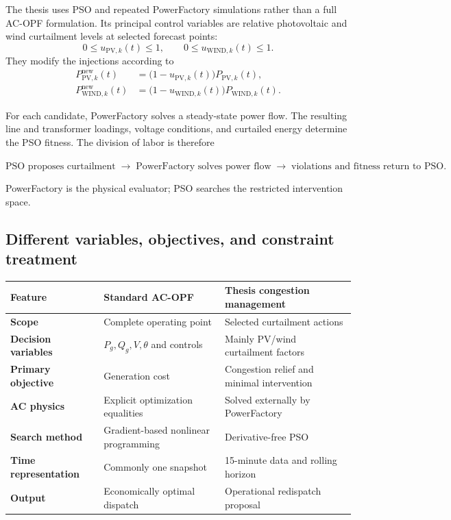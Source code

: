 \documentclass[11pt,a4paper]{article}
\begin{document}
The thesis uses PSO and repeated PowerFactory simulations rather than a full AC-OPF formulation. Its principal control variables are relative photovoltaic and wind curtailment levels at selected forecast points:
\[
0\le u_{\mathrm{PV},k}(t)\le1,
\qquad
0\le u_{\mathrm{WIND},k}(t)\le1.
\]
They modify the injections according to
\begin{align}
P_{\mathrm{PV},k}^{\mathrm{new}}(t)
&=\bigl(1-u_{\mathrm{PV},k}(t)\bigr)P_{\mathrm{PV},k}(t),\\
P_{\mathrm{WIND},k}^{\mathrm{new}}(t)
&=\bigl(1-u_{\mathrm{WIND},k}(t)\bigr)P_{\mathrm{WIND},k}(t).
\end{align}

For each candidate, PowerFactory solves a steady-state power flow. The resulting line and transformer loadings, voltage conditions, and curtailed energy determine the PSO fitness. The division of labor is therefore
\begin{center}
\scriptsize
$\boxed{\text{PSO proposes curtailment}}\;\longrightarrow\;
\boxed{\text{PowerFactory solves power flow}}\;\longrightarrow\;
\boxed{\text{violations and fitness return to PSO}}.$
\end{center}
PowerFactory is the physical evaluator; PSO searches the restricted intervention space.

\subsection{Different variables, objectives, and constraint treatment}

\small
\begin{tabularx}{\textwidth}{>{\bfseries}p{}XX}
\toprule
Feature & Standard AC-OPF & Thesis congestion management\\
\midrule
Scope & Complete operating point & Selected curtailment actions\\
Decision variables & $P_g,Q_g,V,\theta$ and controls & Mainly PV/wind curtailment factors\\
Primary objective & Generation cost & Congestion relief and minimal intervention\\
AC physics & Explicit optimization equalities & Solved externally by PowerFactory\\
Search method & Gradient-based nonlinear programming & Derivative-free PSO\\
Time representation & Commonly one snapshot & 15-minute data and rolling horizon\\
Output & Economically optimal dispatch & Operational redispatch proposal\\
\bottomrule
\end{tabularx}
\normalsize
\end{document}
